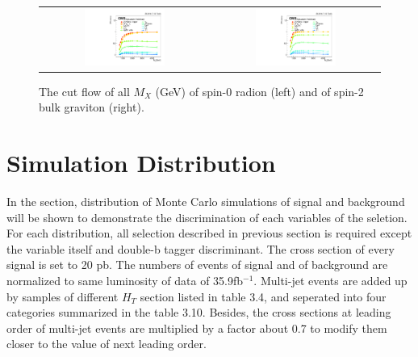 \begin{figure}[t]
  \centering
  \begin{tabular}{cc}
    \includegraphics[width=0.5\textwidth]{Figures/fig_eff_rd.pdf} &
    \includegraphics[width=0.5\textwidth]{Figures/fig_eff_bg.pdf} \\
    
  \end{tabular}
  \caption{The cut flow of all $M_X$ (GeV) of spin-0 radion (left) and of spin-2 bulk graviton (right).}
  \label{fig:hvt_brs}
\end{figure}

\section{Simulation Distribution} 
In the section, distribution of Monte Carlo simulations of signal and background will be shown to demonstrate the discrimination of each variables of the seletion. For each distribution, all selection described in previous section is required except the variable itself and double-b tagger discriminant. The cross section of every signal is set to 20 pb. The numbers of events of signal and of background are normalized to same luminosity of data of 35.9fb$^{-1}$. Multi-jet events are added up by samples of different $H_T$ section listed in table 3.4, and seperated into four categories summarized in the table 3.10.  Besides, the cross sections at leading order of multi-jet events are multiplied by a factor about 0.7 to modify them closer to the value of next leading order.

